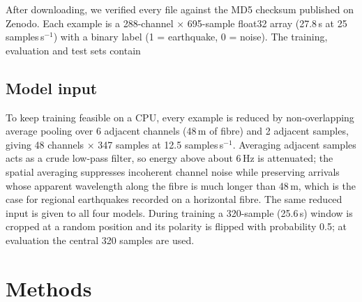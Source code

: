 After downloading, we verified every file against the MD5 checksum published on Zenodo. Each example is a 288-channel $\times$ 695-sample float32 array (27.8\,s at 25 samples\,s$^{-1}$) with a binary label (1 = earthquake, 0 = noise). The training, evaluation and test sets contain %

\subsection*{Model input}
To keep training feasible on a CPU, every example is reduced by non-overlapping average pooling over 6 adjacent channels (48\,m of fibre) and 2 adjacent samples, giving 48 channels $\times$ 347 samples at 12.5 samples\,s$^{-1}$. Averaging adjacent samples acts as a crude low-pass filter, so energy above about 6\,Hz is attenuated; the spatial averaging suppresses incoherent channel noise while preserving arrivals whose apparent wavelength along the fibre is much longer than 48\,m, which is the case for regional earthquakes recorded on a horizontal fibre. The same reduced input is given to all four models. During training a 320-sample (25.6\,s) window is cropped at a random position and its polarity is flipped with probability 0.5; at evaluation the central 320 samples are used.

\section*{Methods}
